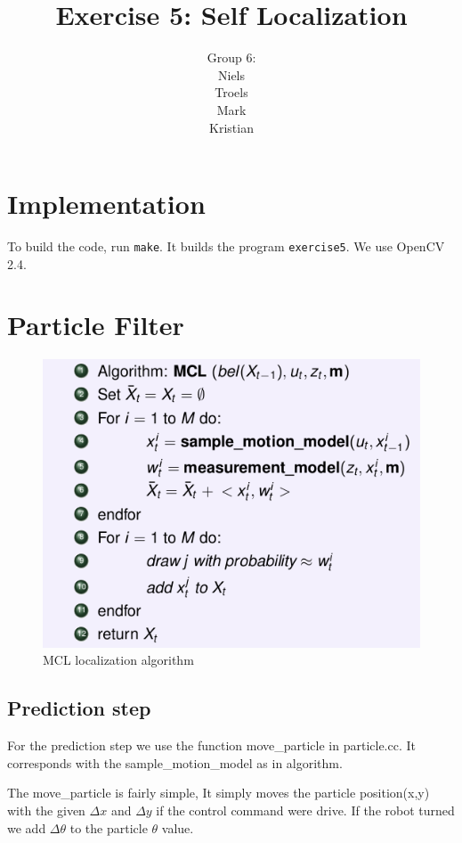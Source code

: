 \documentclass[a4paper,12pt]{article}
\title{Exercise 5: Self Localization}
\author{Group 6:\\Niels\\Troels\\Mark\\Kristian}
\begin{document}
\maketitle
\newpage
\section{Implementation}

To build the code, run \texttt{make}.  It builds the program
\texttt{exercise5}.  We use OpenCV 2.4.


\section{Particle Filter}

\begin{figure}[!h]
\centering
\includegraphics[scale=0.50]{MCL.png}
\caption{MCL localization algorithm}
\label{MCL}
\end{figure}

\subsection{Prediction step}

For the prediction step we use the function move_particle in particle.cc. It
corresponds with the sample_motion_model as in algorithm.

The move_particle is fairly simple, It simply moves the particle position(x,y)
with the given $\Delta x $ and $\Delta y$ if the control command were drive. If
the robot turned we add $\Delta \theta$ to the particle $\theta$ value.
\end{document}
